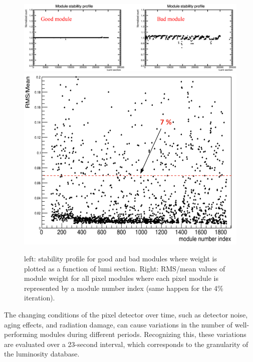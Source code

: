 \begin{center}
  \begin{figure}[h!]
    \centering
    \includegraphics[scale=.17]{Chapter4/good_module.png}\includegraphics[scale=.15]{Chapter4/RMSmean.png}
    \caption[Profile of good and bad modules stability]{ left: stability profile for good and bad modules where weight is plotted as a function of lumi section.  Right: RMS/mean values of module weight for all pixel modules  where each pixel module is represented by a module number index (same happen for the 4\% iteration).} 
    \label{goodmodule}
  \end{figure}
\end{center}

The changing conditions of the pixel detector over time, such as detector noise, aging effects, and radiation damage, can cause variations in the number of well-performing modules during different periods. Recognizing this, these variations are evaluated over a 23-second interval, which corresponds to the granularity of the luminosity database.\\

